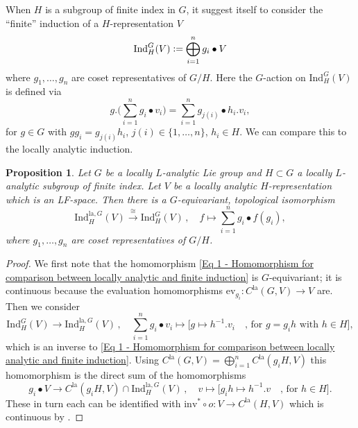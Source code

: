 \documentclass[a4paper, reqno, 10pt]{amsart}
\newtheorem{proposition}[theorem]{Proposition}
\theoremstyle{definition}
\numberwithin{equation}{section}
\newcommand{\defeq}{\vcentcolon=}
\newcommand{\ev}{{\mathrm{ev}}}
\newcommand{\Ind}{{\mathrm{Ind}}}
\newcommand{\inv}{{\mathrm{inv}}}
\newcommand{\la}{{\mathrm{la}}}
\newcommand{\lra}{\longrightarrow}
\newcommand{\lto}{\longmapsto}
\newcommand{\mto}{\mapsto}
\newcommand{\ra}{\rightarrow}
\newcommand{\llrrparen}[1]{\mkern-3mu\left(\mkern-3mu\left(#1\right)\mkern-3mu\right)}
\newcommand{\BF}{{\mathbb {F}}}
\begin{document}
When $H$ is a subgroup of finite index in $G$, it suggest itself to consider the ``finite'' induction of a $H$-representation $V$
\begin{equation*}
	\Ind^G_H (V) \defeq \bigoplus_{i=1}^n g_i \bullet V
\end{equation*}
where $g_1,\ldots,g_n$ are coset representatives of $G/H$.
Here the $G$-action on $\Ind^G_H(V)$ is defined via
\begin{equation*}
	g. \bigg(\sum_{i=1}^{n} g_i \bullet v_i \bigg) = \sum_{i=1}^{n} g_{j(i)}\bullet h_i.v_i ,
\end{equation*}
for $g\in G$ with $g g_i = g_{j(i)}h_i$, $j(i)\in \{1,\ldots,n\}$, $h_i \in H$.
We can compare this to the locally analytic induction.


\begin{proposition}\label{Prop 1 - Isomorphism between locally analytic and finite induction}
	Let $G$ be a locally $L$-analytic Lie group and $H\subset G$ a locally $L$-analytic subgroup of finite index.
	Let $V$ be a locally analytic $H$-representation which is an LF-space.
	Then there is a $G$-equivariant, topological isomorphism
	\begin{equation}\label{Eq 1 - Homomorphism for comparison between locally analytic and finite induction}
		\Ind_{H}^{\la,G} (V) \overset{\cong}{\lra} \Ind_H^{G} (V) \,,\quad f \lto \sum_{i=1}^{n} g_i \bullet f(g_i) ,	
	\end{equation}
	where $g_1,\ldots,g_n$ are coset representatives of $G/H$.
\end{proposition}
\begin{proof}
	We first note that the homomorphism \eqref{Eq 1 - Homomorphism for comparison between locally analytic and finite induction} is $G$-equivariant; it is continuous because the evaluation homomorphisms $\ev_{g_i} \colon C^\la(G,V) \ra V$ are.
	Then we consider	
	\begin{equation*}
		\Ind_{H}^{G} (V) \lra \Ind_H^{\la,G} (V) \,,\quad \sum_{i=1}^{n} g_i \bullet v_i \lto \big[ g \mto h^{-1}.v_i \quad\text{, for $g=g_i h$ with $h\in H$} \big] ,
	\end{equation*}
	which is an inverse to \eqref{Eq 1 - Homomorphism for comparison between locally analytic and finite induction}. 
	Using $C^\la(G,V) = \bigoplus_{i=1}^n C^\la(g_i H,V)$ this homomorphism is the direct sum of the homomorphisms
	\begin{equation*}
		g_i \bullet V \lra C^\la (g_i H, V) \cap \Ind^{\la, G}_H(V) \,,\quad v \lto \big[ g_i h \mto h^{-1}.v \quad \text{, for $h \in H$} \big] .
	\end{equation*}
	These in turn each can be identified with $\inv^\ast \circ o \colon V \ra C^\la(H,V)$ which is continuous by .
\end{proof}
\end{document}
